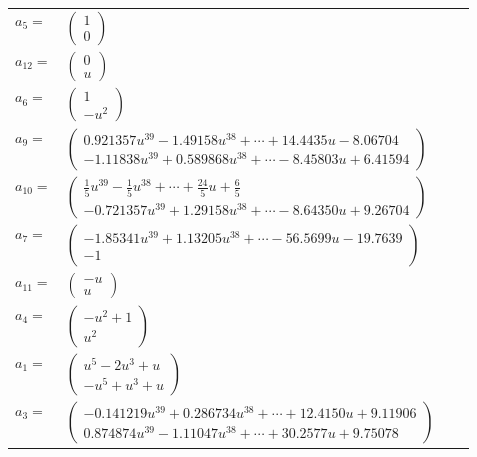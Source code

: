 \documentclass[1p]{elsarticle_modified}
\theoremstyle{definition}
\begin{document}
\begin{tabular}{m{7pt} m{180pt} m{7pt} m{180pt} }
\flushright $a_{5}=$&$\begin{pmatrix}1\\0\end{pmatrix}$ \\
\flushright $a_{12}=$&$\begin{pmatrix}0\\u\end{pmatrix}$ \\
\flushright $a_{6}=$&$\begin{pmatrix}1\\- u^2\end{pmatrix}$ \\
\flushright $a_{9}=$&$\begin{pmatrix}0.921357 u^{39}-1.49158 u^{38}+\cdots+14.4435 u-8.06704\\-1.11838 u^{39}+0.589868 u^{38}+\cdots-8.45803 u+6.41594\end{pmatrix}$ \\
\flushright $a_{10}=$&$\begin{pmatrix}\frac{1}{5} u^{39}-\frac{1}{5} u^{38}+\cdots+\frac{24}{5} u+\frac{6}{5}\\-0.721357 u^{39}+1.29158 u^{38}+\cdots-8.64350 u+9.26704\end{pmatrix}$ \\
\flushright $a_{7}=$&$\begin{pmatrix}-1.85341 u^{39}+1.13205 u^{38}+\cdots-56.5699 u-19.7639\\-1\end{pmatrix}$ \\
\flushright $a_{11}=$&$\begin{pmatrix}- u\\u\end{pmatrix}$ \\
\flushright $a_{4}=$&$\begin{pmatrix}- u^2+1\\u^2\end{pmatrix}$ \\
\flushright $a_{1}=$&$\begin{pmatrix}u^5-2 u^3+u\\- u^5+u^3+u\end{pmatrix}$ \\
\flushright $a_{3}=$&$\begin{pmatrix}-0.141219 u^{39}+0.286734 u^{38}+\cdots+12.4150 u+9.11906\\0.874874 u^{39}-1.11047 u^{38}+\cdots+30.2577 u+9.75078\end{pmatrix}$ \\

\end{tabular}
\end{document}
